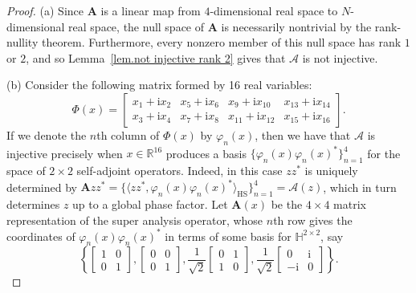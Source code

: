 \documentclass[times,10pt]{elsarticle}
\theoremstyle{plain}
\begin{document}
\begin{proof}
(a) 
Since $\mathbf{A}$ is a linear map from $4$-dimensional real space to $N$-dimensional real space, the null space of $\mathbf{A}$ is necessarily nontrivial by the rank-nullity theorem.
Furthermore, every nonzero member of this null space has rank $1$ or $2$, and so Lemma~\ref{lem.not injective rank 2} gives that $\mathcal{A}$ is not injective.

(b)
Consider the following matrix formed by 16 real variables:
\begin{equation}
\label{eq.variable matrix}
\Phi(x)=
\left[\begin{array}{cccc}
x_1+\mathrm{i}x_2 & x_5+\mathrm{i}x_6 & x_9+\mathrm{i}x_{10} & x_{13}+\mathrm{i}x_{14} \\
x_3+\mathrm{i}x_4 & x_7+\mathrm{i}x_8 & x_{11}+\mathrm{i}x_{12} & x_{15}+\mathrm{i}x_{16} 
\end{array}\right].
\end{equation}
If we denote the $n$th column of $\Phi(x)$ by $\varphi_n(x)$, then we have that $\mathcal{A}$ is injective precisely when $x\in\mathbb{R}^{16}$ produces a basis $\{\varphi_n(x)\varphi_n(x)^*\}_{n=1}^{4}$ for the space of $2\times 2$ self-adjoint operators.
Indeed, in this case $zz^*$ is uniquely determined by $\mathbf{A}zz^*=\{\langle zz^*,\varphi_n(x)\varphi_n(x)^*\rangle_\mathrm{HS}\}_{n=1}^{4}=\mathcal{A}(z)$, which in turn determines $z$ up to a global phase factor.
Let $\mathbf{A}(x)$ be the $4\times 4$ matrix representation of the super analysis operator, whose $n$th row gives the coordinates of $\varphi_n(x)\varphi_n(x)^*$ in terms of some basis for $\mathbb{H}^{2\times 2}$, say
\begin{equation}
\label{eq.onb for h}
\left\{
\left[\begin{array}{rr}
1 & 0 \\ 0 & 1
\end{array}\right],
\left[\begin{array}{rr}
0 & 0 \\ 0 & 1
\end{array}\right],
\frac{1}{\sqrt{2}}\left[\begin{array}{rr}
0 & 1 \\ 1 & 0
\end{array}\right],
\frac{1}{\sqrt{2}}\left[\begin{array}{rr}
0 & \mathrm{i} \\ -\mathrm{i} & 0
\end{array}\right]
\right\}.
\end{equation}

\end{proof}
\end{document}
